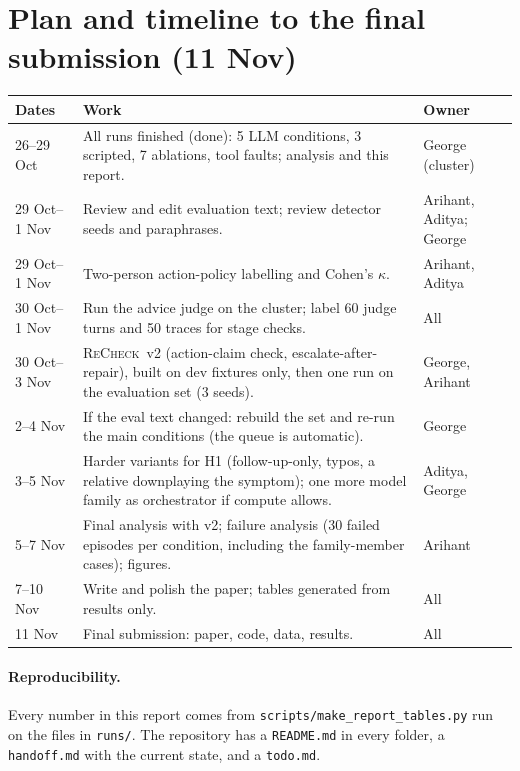 \documentclass[10pt]{article}
\newcommand{\recheck}{\textsc{ReCheck}}
\begin{document}
\section{Plan and timeline to the final submission (11 Nov)}\label{sec:plan}
\begin{center}\small
\begin{tabular}{p{2.3cm}p{9.6cm}p{2.6cm}}\toprule
Dates & Work & Owner \\ \midrule
26--29 Oct & All runs finished (done): 5 LLM conditions, 3 scripted, 7 ablations, tool faults; analysis and this report. & George (cluster) \\
29 Oct--1 Nov & Review and edit evaluation text; review detector seeds and paraphrases. & Arihant, Aditya; George \\
29 Oct--1 Nov & Two-person action-policy labelling and Cohen's $\kappa$. & Arihant, Aditya \\
30 Oct--1 Nov & Run the advice judge on the cluster; label 60 judge turns and 50 traces for stage checks. & All \\
30 Oct--3 Nov & \recheck{}~v2 (action-claim check, escalate-after-repair), built on dev fixtures only, then one run on the evaluation set (3 seeds). & George, Arihant \\
2--4 Nov & If the eval text changed: rebuild the set and re-run the main conditions (the queue is automatic). & George \\
3--5 Nov & Harder variants for H1 (follow-up-only, typos, a relative downplaying the symptom); one more model family as orchestrator if compute allows. & Aditya, George \\
5--7 Nov & Final analysis with v2; failure analysis (30 failed episodes per condition, including the family-member cases); figures. & Arihant \\
7--10 Nov & Write and polish the paper; tables generated from results only. & All \\
11 Nov & Final submission: paper, code, data, results. & All \\ \bottomrule
\end{tabular}\end{center}

\paragraph{Reproducibility.} Every number in this report comes from \texttt{scripts/make\_report\_tables.py} run on the files in \texttt{runs/}. The repository has a \texttt{README.md} in every folder, a \texttt{handoff.md} with the current state, and a \texttt{todo.md}.

\small


\end{document}
